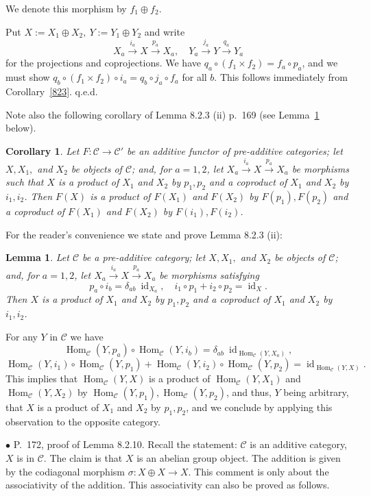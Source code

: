 \documentclass[12pt]{article}
\newtheorem{lem}[thm]{Lemma}
\newtheorem{cor}[thm]{Corollary}
\theoremstyle{remark}%
\newcommand{\bu}{\bullet}
\newcommand{\n}{\noindent}
\newcommand{\C}{\mathcal C}
\newcommand{\xr}{\xrightarrow}
\DeclareMathOperator{\id}{id}
\DeclareMathOperator{\h}{Hom}
\begin{document}
We denote this morphism by $f_1\oplus f_2$.\medskip 

\n{\em Proof.} Put $X:=X_1\oplus X_2,\ Y:=Y_1\oplus Y_2$ and write 
$$
X_a\xr{i_a}X\xr{p_a}X_a,\quad Y_a\xr{j_a}Y\xr{q_a}Y_a
$$ 
for the projections and coprojections. We have $q_a\circ(f_1\times f_2)=f_a\circ p_a$, and we must show $q_b\circ (f_1\times f_2)\circ i_a=q_b\circ j_a\circ f_a$ for all $b$. This follows immediately from Corollary~\ref{823}. q.e.d. 

Note also the following corollary of Lemma 8.2.3 (ii) p.~169 (see Lemma~\ref{823ii} below). 
%
\begin{cor}\label{823b}
Let $F:\C\to\C'$ be an additive functor of pre-additive categories; let $X,X_1,$ and $X_2$ be objects of $\C$; and, for $a=1,2$, let $X_a\xr{i_a}X\xr{p_a}X_a$ be morphisms such that $X$ is a product of $X_1$ and $X_2$ by $p_1,p_2$ and a coproduct of $X_1$ and $X_2$ by $i_1,i_2$. Then $F(X)$ is a product of $F(X_1)$ and $F(X_2)$ by $F(p_1),F(p_2)$ and a coproduct of $F(X_1)$ and $F(X_2)$ by $F(i_1),F(i_2)$. 
\end{cor}

For the reader's convenience we state and prove Lemma 8.2.3 (ii):
%
\begin{lem}\label{823ii}
Let $\C$ be a pre-additive category; let $X,X_1,$ and $X_2$ be objects of $\C$; and, for $a=1,2$, let $X_a\xr{i_a}X\xr{p_a}X_a$ be morphisms satisfying 
$$
p_a\circ i_b=\delta_{ab}\ \id_{X_a},\quad i_1\circ p_1+i_2\circ p_2=\id_X.
$$
Then $X$ is a product of $X_1$ and $X_2$ by $p_1,p_2$ and a coproduct of $X_1$ and $X_2$ by $i_1,i_2$. 
\end{lem}
%
\n{\em Proof.} For any $Y$ in $\C$ we have 
$$
\h_\C(Y,p_a)\circ\h_\C(Y,i_b)=\delta_{ab}\ \id_{\h_\C(Y,X_a)},
$$ 
$$
\h_\C(Y,i_1)\circ\h_\C(Y,p_1)+\h_\C(Y,i_2)\circ\h_\C(Y,p_2)=\id_{\h_\C(Y,X)}.
$$ 
This implies that $\h_\C(Y,X)$ is a product of $\h_\C(Y,X_1)$ and $\h_\C(Y,X_2)$ by $\h_\C(Y,p_1),\h_\C(Y,p_2)$, and thus, $Y$ being arbitrary, that $X$ is a product of $X_1$ and $X_2$ by $p_1,p_2$, and we conclude by applying this observation to the opposite category. 


\n$\bu$ P.~172, proof of Lemma 8.2.10. Recall the statement: $\C$ is an additive category, $X$ is in $\C$. The claim is that $X$ is an abelian group object. The addition is given by the codiagonal morphism $\sigma:X\oplus X\to X$. This comment is only about the associativity of the addition. This associativity can also be proved as follows. 
\end{document}
